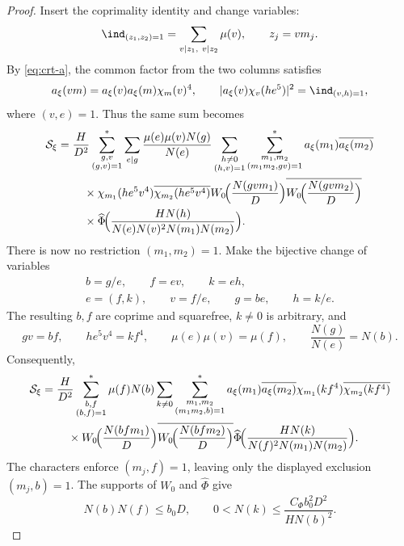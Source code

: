 \begin{proof}
Insert the coprimality identity and change variables:
\[
 \ind_{(z_1,z_2)=1}
 =\sum_{v\mid z_1,\ v\mid z_2}\mu(v),
 \qquad z_j=vm_j.
\]
By \eqref{eq:crt-a}, the common factor from the two columns satisfies
\[
 a_\xi(vm)=a_\xi(v)a_\xi(m)\chi_m(v)^4,
 \qquad
 |a_\xi(v)\chi_v(he^5)|^2=\ind_{(v,h)=1},
\]
where $(v,e)=1$. Thus the same sum becomes
\[
 \begin{aligned}
 \mathcal S_\xi
 ={}&\frac H{D^2}
 \sum_{\substack{g,v\\(g,v)=1}}^*
 \sum_{e\mid g}\frac{\mu(e)\mu(v)N(g)}{N(e)}
 \sum_{\substack{h\ne0\\(h,v)=1}}
 \sum_{\substack{m_1,m_2\\(m_1m_2,gv)=1}}^*
 a_\xi(m_1)\overline{a_\xi(m_2)}
 \\
 &\quad{}\times
 \chi_{m_1}(he^5v^4)\overline{\chi_{m_2}(he^5v^4)}
 W_0\!\Bigl(\frac{N(gvm_1)}D\Bigr)
 \overline{W_0\!\Bigl(\frac{N(gvm_2)}D\Bigr)}
 \\
 &\quad{}\times
 \widehat\Phi\!\Bigl(
 \frac{HN(h)}{N(e)N(v)^2N(m_1)N(m_2)}
 \Bigr).
 \end{aligned}
\]
There is now no restriction $(m_1,m_2)=1$.
Make the bijective change of variables
\[
 \begin{gathered}
 b=g/e,\qquad f=ev,\qquad k=eh,\\
 e=(f,k),\qquad v=f/e,\qquad g=be,\qquad h=k/e.
 \end{gathered}
\]
The resulting $b,f$ are coprime and squarefree, $k\ne0$ is arbitrary,
and
\[
 gv=bf,\qquad he^5v^4=kf^4,\qquad
 \mu(e)\mu(v)=\mu(f),\qquad
 \frac{N(g)}{N(e)}=N(b).
\]
Consequently,
\begin{equation}\label{eq:initial-column-output}
 \begin{aligned}
 \mathcal S_\xi
 ={}&\frac H{D^2}
 \sum_{\substack{b,f\\(b,f)=1}}^*\mu(f)N(b)
 \sum_{k\ne0}
 \sum_{\substack{m_1,m_2\\(m_1m_2,b)=1}}^*
 a_\xi(m_1)\overline{a_\xi(m_2)}
 \chi_{m_1}(kf^4)\overline{\chi_{m_2}(kf^4)}
 \\
 &\quad{}\times
 W_0\!\Bigl(\frac{N(bfm_1)}D\Bigr)
 \overline{W_0\!\Bigl(\frac{N(bfm_2)}D\Bigr)}
 \widehat\Phi\!\Bigl(
 \frac{HN(k)}{N(f)^2N(m_1)N(m_2)}
 \Bigr).
 \end{aligned}
\end{equation}
The characters enforce $(m_j,f)=1$, leaving only the displayed
exclusion $(m_j,b)=1$.
The supports of $W_0$ and $\widehat\Phi$ give
\[
 N(b)N(f)\le b_0D,\qquad
 0<N(k)\le\frac{C_\Phi b_0^2D^2}{HN(b)^2}.
\]


\end{proof}
